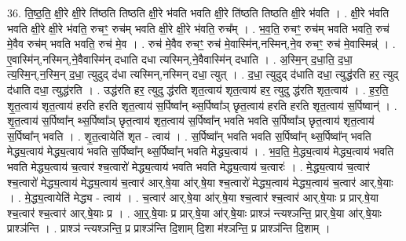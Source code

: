 \documentclass[17pt]{extarticle}
\begin{document}
36. ति॒ष्ठ॒ति॒ क्षी॒रे क्षी॒रे ति॑ष्ठति तिष्ठति क्षी॒रे भ॑वति भवति क्षी॒रे ति॑ष्ठति तिष्ठति क्षी॒रे भ॑वति । . क्षी॒रे भ॑वति भवति क्षी॒रे क्षी॒रे भ॑वति॒ रुचꣳ॒॒ रुच॑म् भवति क्षी॒रे क्षी॒रे भ॑वति॒ रुच᳚म् । . भ॒व॒ति॒ रुचꣳ॒॒ रुच॑म् भवति भवति॒ रुच॑ मे॒वैव रुच॑म् भवति भवति॒ रुच॑ मे॒व । . रुच॑ मे॒वैव रुचꣳ॒॒ रुच॑ मे॒वास्मि॑न्,नस्मिन्,ने॒व रुचꣳ॒॒ रुच॑ मे॒वास्मिन्न्॑ । . ए॒वास्मि॑न्,नस्मिन्,ने॒वैवास्मि॑न् दधाति दधा त्यस्मिन्,ने॒वैवास्मि॑न् दधाति । . अ॒स्मि॒न् द॒धा॒ति॒ द॒धा॒ त्य॒स्मि॒न्,न॒स्मि॒न् द॒धा॒ त्युदुद् द॑धा त्यस्मिन्,नस्मिन् दधा॒ त्युत् । . द॒धा॒ त्युदुद् द॑धाति दधा॒ त्युद्ध॑रति हर॒ त्युद् द॑धाति दधा॒ त्युद्ध॑रति । . उद्ध॑रति हर॒ त्युदु द्ध॑रति शृत॒त्वाय॑ शृत॒त्वाय॑ हर॒ त्युदु द्ध॑रति शृत॒त्वाय॑ । . ह॒र॒ति॒ शृ॒त॒त्वाय॑ शृत॒त्वाय॑ हरति हरति शृत॒त्वाय॑ स॒र्पिष्वा᳚न् थ्स॒र्पिष्वा᳚ञ् छृत॒त्वाय॑ हरति हरति 
शृत॒त्वाय॑ स॒र्पिष्वान्॑ । . शृ॒त॒त्वाय॑ स॒र्पिष्वा᳚न् थ्स॒र्पिष्वा᳚ञ् छृत॒त्वाय॑ शृत॒त्वाय॑ स॒र्पिष्वा᳚न् भवति भवति स॒र्पिष्वा᳚ञ् छृत॒त्वाय॑ शृत॒त्वाय॑ स॒र्पिष्वा᳚न् भवति । . शृ॒त॒त्वायेति॑ शृत - त्वाय॑ । . स॒र्पिष्वा᳚न् भवति भवति स॒र्पिष्वा᳚न् थ्स॒र्पिष्वा᳚न् भवति मेद्ध्य॒त्वाय॑ मेद्ध्य॒त्वाय॑ भवति स॒र्पिष्वा᳚न् थ्स॒र्पिष्वा᳚न् भवति मेद्ध्य॒त्वाय॑ । . भ॒व॒ति॒ मे॒द्ध्य॒त्वाय॑ मेद्ध्य॒त्वाय॑ भवति भवति मेद्ध्य॒त्वाय॑ च॒त्वार॑ श्च॒त्वारो॑ मेद्ध्य॒त्वाय॑ भवति भवति मेद्ध्य॒त्वाय॑ च॒त्वारः॑ । . मे॒द्ध्य॒त्वाय॑ च॒त्वार॑ श्च॒त्वारो॑ मेद्ध्य॒त्वाय॑ मेद्ध्य॒त्वाय॑ च॒त्वार॑ आर्.षे॒या आ॑र्.षे॒या श्च॒त्वारो॑ मेद्ध्य॒त्वाय॑ मेद्ध्य॒त्वाय॑ च॒त्वार॑ आर्.षे॒याः । . मे॒द्ध्य॒त्वायेति॑ मेद्ध्य - त्वाय॑ । . च॒त्वार॑ आर्.षे॒या आ॑र्.षे॒या श्च॒त्वार॑ श्च॒त्वार॑ आर्.षे॒याः प्र प्रार्.षे॒या श्च॒त्वार॑ श्च॒त्वार॑ आर्.षे॒याः प्र । . आ॒र्॒.षे॒याः प्र प्रार्.षे॒या आ॑र्.षे॒याः प्राश्ञ॑ न्त्यश्ञन्ति॒ प्रार्.षे॒या आ॑र्.षे॒याः प्राश्ञ॑न्ति । . प्राश्ञ॑ न्त्यश्ञन्ति॒ प्र प्राश्ञ॑न्ति दि॒शाम् दि॒शा म॑श्ञन्ति॒ प्र प्राश्ञ॑न्ति दि॒शाम् । \newline
\end{document}
